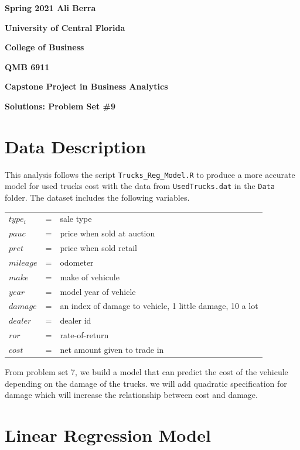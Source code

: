 \documentclass[11pt]{paper}
\begin{document}

\pagestyle{empty}
{\noindent\bf Spring 2021 \hfill Ali Berra}
\vskip 16pt
\centerline{\bf University of Central Florida}
\centerline{\bf College of Business}
\vskip 16pt
\centerline{\bf QMB 6911}
\centerline{\bf Capstone Project in Business Analytics}
\vskip 10pt
\centerline{\bf Solutions:  Problem Set \#9}
\vskip 32pt
\noindent
% 
\section{Data Description}

This analysis follows the script \texttt{Trucks\_Reg\_Model.R} to produce a more accurate model for used trucks cost with the data from \texttt{UsedTrucks.dat} in the \texttt{Data} folder. 
The dataset includes the following variables.
\begin{table}[h!]
\begin{tabular}{l l l}

$type_i$ & = & sale type \\

$pauc$ & = & price when sold at auction \\
$ pret$ & = &price when sold retail \\ 
$mileage$ & = & odometer \\ %
$make$ & = &make of vehicule \\
$year$ & = &model year of vehicle \\ 
$damage$ & = & an index of damage to vehicle, 1 little damage, 10 a lot\\
$dealer$ & = & dealer id \\ 
$ror$& = &rate-of-return\\
$cost$& = &net amount given to trade in\\


\end{tabular}
\end{table}
%
From problem set 7, we build a model that can predict the cost of the vehicule depending 
on the damage of the trucks. we will add quadratic specification for damage 
which will increase the relationship between cost and damage. 



\clearpage
\section{Linear Regression Model}
\end{document}
